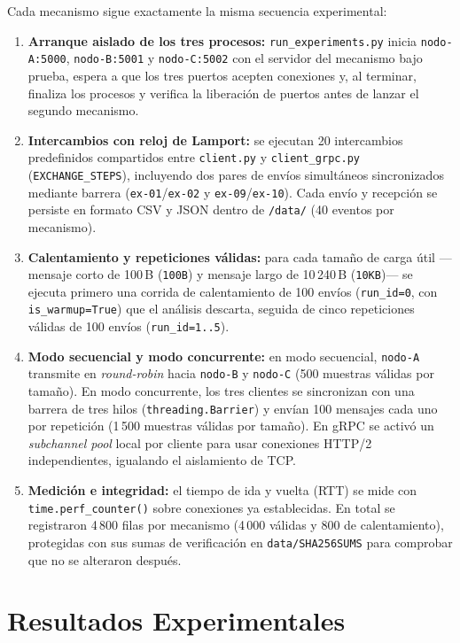 \documentclass[12pt,a4paper]{article}
\begin{document}
Cada mecanismo sigue exactamente la misma secuencia experimental:
\begin{enumerate}
  \item \textbf{Arranque aislado de los tres procesos:} \texttt{run\_experiments.py} inicia \texttt{nodo-A:5000}, \texttt{nodo-B:5001} y \texttt{nodo-C:5002} con el servidor del mecanismo bajo prueba, espera a que los tres puertos acepten conexiones y, al terminar, finaliza los procesos y verifica la liberación de puertos antes de lanzar el segundo mecanismo.
  \item \textbf{Intercambios con reloj de Lamport:} se ejecutan 20 intercambios predefinidos compartidos entre \texttt{client.py} y \texttt{client\_grpc.py} (\texttt{EXCHANGE\_STEPS}), incluyendo dos pares de envíos simultáneos sincronizados mediante barrera (\texttt{ex-01}/\texttt{ex-02} y \texttt{ex-09}/\texttt{ex-10}). Cada envío y recepción se persiste en formato CSV y JSON dentro de \texttt{/data/} (40 eventos por mecanismo).
  \item \textbf{Calentamiento y repeticiones válidas:} para cada tamaño de carga útil ---mensaje corto de 100\,B (\texttt{100B}) y mensaje largo de 10\,240\,B (\texttt{10KB})--- se ejecuta primero una corrida de calentamiento de 100 envíos (\texttt{run\_id=0}, con \texttt{is\_warmup=True}) que el análisis descarta, seguida de cinco repeticiones válidas de 100 envíos (\texttt{run\_id=1..5}).
  \item \textbf{Modo secuencial y modo concurrente:} en modo secuencial, \texttt{nodo-A} transmite en \emph{round-robin} hacia \texttt{nodo-B} y \texttt{nodo-C} (500 muestras válidas por tamaño). En modo concurrente, los tres clientes se sincronizan con una barrera de tres hilos (\texttt{threading.Barrier}) y envían 100 mensajes cada uno por repetición (1\,500 muestras válidas por tamaño). En gRPC se activó un \emph{subchannel pool} local por cliente para usar conexiones HTTP/2 independientes, igualando el aislamiento de TCP.
  \item \textbf{Medición e integridad:} el tiempo de ida y vuelta (RTT) se mide con \texttt{time.perf\_counter()} sobre conexiones ya establecidas. En total se registraron 4\,800 filas por mecanismo (4\,000 válidas y 800 de calentamiento), protegidas con sus sumas de verificación en \texttt{data/SHA256SUMS} para comprobar que no se alteraron después.
\end{enumerate}

\section{Resultados Experimentales}
\label{sec:resultados}
\end{document}
